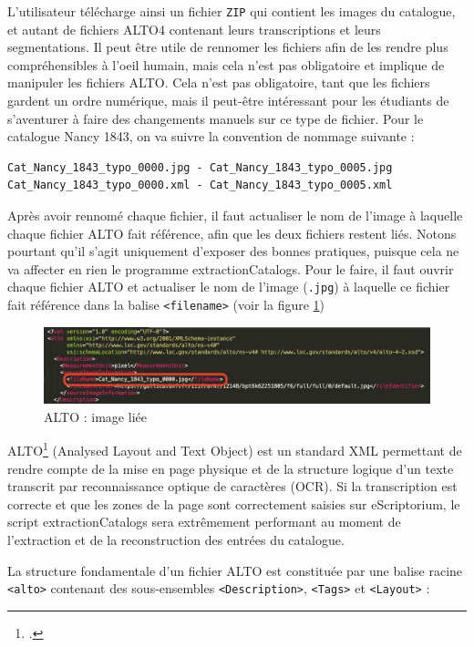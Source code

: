 \documentclass[a4paper,12pt,twoside]{book}
\begin{document}
L'utilisateur télécharge ainsi un fichier \texttt{ZIP} qui contient les images du catalogue, et autant de fichiers ALTO4 contenant leurs transcriptions et leurs segmentations. Il peut être utile de rennomer les fichiers afin de les rendre plus compréhensibles à l'oeil humain, mais cela n'est pas obligatoire et implique de manipuler les fichiers ALTO. Cela n'est pas obligatoire, tant que les fichiers gardent un ordre numérique, mais il peut-être intéressant pour les étudiants de s'aventurer à faire des changements manuels sur ce type de fichier. Pour le catalogue Nancy 1843, on va suivre la convention de nommage suivante :
\begin{normalsize}
	\begin{verbatim}
Cat_Nancy_1843_typo_0000.jpg - Cat_Nancy_1843_typo_0005.jpg 
Cat_Nancy_1843_typo_0000.xml - Cat_Nancy_1843_typo_0005.xml
	\end{verbatim}
\end{normalsize}
Après avoir rennomé chaque fichier, il faut actualiser le nom de l'image à laquelle chaque fichier ALTO fait référence, afin que les deux fichiers restent liés. Notons pourtant qu'il s'agit uniquement d'exposer des bonnes pratiques, puisque cela ne va affecter en rien le programme extractionCatalogs. Pour le faire, il faut ouvrir chaque fichier ALTO et actualiser le nom de l'image (\texttt{.jpg}) à laquelle ce fichier fait référence dans la balise \texttt{<filename>} (voir la figure \ref{imageref})
\begin{figure}[ht]
	\centering
	\includegraphics[scale=0.5]{filename.png}		
	\caption{ALTO : image liée}
	\label{imageref}
\end{figure}


ALTO\footcite{alto_editorial_board_alto_2004} (Analysed Layout and Text Object) est un standard XML permettant de rendre compte de la mise en page physique et de la structure logique d'un texte transcrit par reconnaissance optique de caractères (OCR). Si la transcription est correcte et que les zones de la page sont correctement saisies sur eScriptorium, le script extractionCatalogs sera extrêmement performant au moment de l'extraction et de la reconstruction des entrées du catalogue. 

La structure fondamentale d'un fichier ALTO est constituée par une balise racine \texttt{<alto>} contenant des sous-ensembles \texttt{<Description>}, \texttt{<Tags>} et \texttt{<Layout>} :
\end{document}
